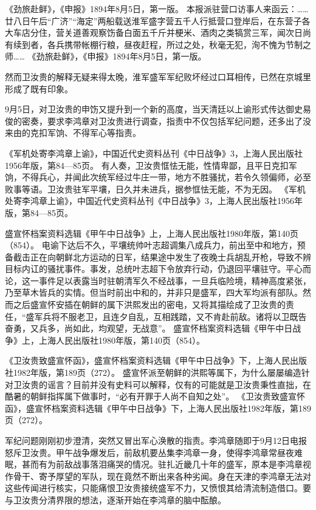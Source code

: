 \documentclass[12pt,UTF8]{ctexbook}
\begin{document}
《劲旅赴鲜》，《申报》1894年8月5日，第一版。
本报派驻营口访事人来函云：……廿八日午后“广济”“海定”两船载送淮军盛字营五千人行抵营口登岸后，在东营子各大车店分住，营关道善观察饬备白面五千斤并梗米、酒肉之类犒赏三军，闻次日尚有续到者，各兵携带帐棚行粮，昼夜赶程，所过之处，秋毫无犯，洵不愧为节制之师…… 《劲旅赴鲜》，《申报》1894年8月5日，第一版。

然而卫汝贵的解释无疑来得太晚，淮军盛军军纪败坏经过口耳相传，已然在京城里形成了既有印象。

9月5日，对卫汝贵的申饬又提升到一个新的高度，当天清廷以上谕形式传达御史易俊的密奏，要求李鸿章对卫汝贵进行调查，指责中不仅包括军纪问题，还多出了没来由的克扣军饷、不得军心等指责。

《军机处寄李鸿章上谕》，中国近代史资料丛刊《中日战争》3，上海人民出版社1956年版，第84—85页。
有人奏，卫汝贵恇怯无能，性情卑鄙，且平日克扣军饷，不得兵心，并闻此次统军经过牛庄一带，地方不胜骚扰，若令久领偏师，必至败事等语。卫汝贵驻军平壤，日久并未进兵，据参恇怯无能，不为无因。 《军机处寄李鸿章上谕》，中国近代史资料丛刊《中日战争》3，上海人民出版社1956年版，第84—85页。

盛宣怀档案资料选辑《甲午中日战争》上，上海人民出版社1980年版，第140页（854）。
电谕下达后不久，平壤统帅叶志超调集八成兵力，前出至中和地方，预备截击正在向朝鲜北方运动的日军，结果途中发生了夜晚士兵胡乱开枪，导致不辨目标内讧的骚扰事件。事发，总统叶志超下令放弃行动，仍退回平壤驻守。平心而论，这一事件足以表露当时驻朝清军久不经战事，一旦兵临险境，精神高度紧张，乃至草木皆兵的实情。但当时前出中和的，并非只是盛军，四大军均派有部队。然而之后盛宣怀安插在朝鲜的属下洪熙发出的密电，又将其描绘成了卫汝贵的责任，“盛军兵将不服老卫，且连夕自乱，互相践踏，又不肯赴前敌。诸将以卫既告奋勇，又兵多，尚如此，均观望，无战意”。 盛宣怀档案资料选辑《甲午中日战争》上，上海人民出版社1980年版，第140页（854）。

《卫汝贵致盛宣怀函》，盛宣怀档案资料选辑《甲午中日战争》下，上海人民出版社1982年版，第189页（272）。
盛宣怀派至朝鲜的洪熙等属下，为什么屡屡编造针对卫汝贵的谣言？目前并没有史料可以解释，仅有的可能就是卫汝贵秉性直拙，在酷暑的朝鲜指挥属下做事时，“必有开罪于人尚不自知之处”。 《卫汝贵致盛宣怀函》，盛宣怀档案资料选辑《甲午中日战争》下，上海人民出版社1982年版，第189页（272）。

军纪问题刚刚初步澄清，突然又冒出军心涣散的指责。李鸿章随即于9月12日电报怒斥卫汝贵。甲午战争爆发后，前敌机要丛集李鸿章一身，使得李鸿章常昼夜难眠，甚而有为前敌战事落泪痛哭的情况。驻扎近畿几十年的盛军，原本是李鸿章视作骨干、寄予厚望的军队，现在竟然不断出来各种劣闻。身在天津的李鸿章无法对这些传闻进行核实，只能痛恨卫汝贵接统盛军不力，又愤恨其给清流制造借口。要与卫汝贵分清界限的想法，逐渐开始在李鸿章的脑中酝酿。
\end{document}

